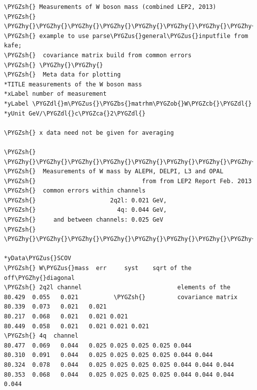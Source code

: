 \documentclass[a4paper,10pt,english]{sphinxmanual}
\def\PYGZbs{\char`\\}
\def\PYGZus{\char`\_}
\def\PYGZob{\char`\{}
\def\PYGZcb{\char`\}}
\def\PYGZca{\char`\^}
\def\PYGZsh{\char`\#}
\def\PYGZdl{\char`\$}
\def\PYGZhy{\char`\-}
\begin{document}
\begin{Verbatim}[commandchars=\\\{\}]
\PYGZsh{} Measurements of W boson mass (combined LEP2, 2013)
\PYGZsh{} \PYGZhy{}\PYGZhy{}\PYGZhy{}\PYGZhy{}\PYGZhy{}\PYGZhy{}\PYGZhy{}\PYGZhy{}\PYGZhy{}\PYGZhy{}\PYGZhy{}\PYGZhy{}\PYGZhy{}\PYGZhy{}\PYGZhy{}\PYGZhy{}\PYGZhy{}\PYGZhy{}\PYGZhy{}\PYGZhy{}\PYGZhy{}\PYGZhy{}\PYGZhy{}\PYGZhy{}\PYGZhy{}\PYGZhy{}\PYGZhy{}\PYGZhy{}\PYGZhy{}\PYGZhy{}\PYGZhy{}\PYGZhy{}\PYGZhy{}\PYGZhy{}\PYGZhy{}\PYGZhy{}\PYGZhy{}\PYGZhy{}\PYGZhy{}\PYGZhy{}\PYGZhy{}\PYGZhy{}\PYGZhy{}\PYGZhy{}\PYGZhy{}\PYGZhy{}\PYGZhy{}\PYGZhy{}\PYGZhy{}\PYGZhy{}
\PYGZsh{} example to use parse\PYGZus{}general\PYGZus{}inputfile from kafe;
\PYGZsh{}  covariance matrix build from common errors
\PYGZsh{} \PYGZhy{}\PYGZhy{}
\PYGZsh{}  Meta data for plotting
*TITLE measurements of the W boson mass
*xLabel number of measurement
*yLabel \PYGZdl{}m\PYGZus{}\PYGZbs{}matrhm\PYGZob{}W\PYGZcb{}\PYGZdl{}
*yUnit GeV/\PYGZdl{}c\PYGZca{}2\PYGZdl{}

\PYGZsh{} x data need not be given for averaging

\PYGZsh{} \PYGZhy{}\PYGZhy{}\PYGZhy{}\PYGZhy{}\PYGZhy{}\PYGZhy{}\PYGZhy{}\PYGZhy{}\PYGZhy{}\PYGZhy{}\PYGZhy{}\PYGZhy{}\PYGZhy{}\PYGZhy{}\PYGZhy{}\PYGZhy{}\PYGZhy{}\PYGZhy{}\PYGZhy{}\PYGZhy{}\PYGZhy{}\PYGZhy{}\PYGZhy{}\PYGZhy{}\PYGZhy{}\PYGZhy{}\PYGZhy{}\PYGZhy{}\PYGZhy{}\PYGZhy{}\PYGZhy{}\PYGZhy{}\PYGZhy{}\PYGZhy{}\PYGZhy{}\PYGZhy{}\PYGZhy{}\PYGZhy{}\PYGZhy{}\PYGZhy{}\PYGZhy{}\PYGZhy{}\PYGZhy{}\PYGZhy{}\PYGZhy{}\PYGZhy{}\PYGZhy{}\PYGZhy{}\PYGZhy{}\PYGZhy{}\PYGZhy{}\PYGZhy{}\PYGZhy{}\PYGZhy{}\PYGZhy{}\PYGZhy{}\PYGZhy{}\PYGZhy{}\PYGZhy{}\PYGZhy{}
\PYGZsh{}  Measurements of W mass by ALEPH, DELPI, L3 and OPAL
\PYGZsh{}                              from from LEP2 Report Feb. 2013
\PYGZsh{}  common errors within channels
\PYGZsh{}                     2q2l: 0.021 GeV,
\PYGZsh{}                       4q: 0.044 GeV,
\PYGZsh{}     and between channels: 0.025 GeV
\PYGZsh{} \PYGZhy{}\PYGZhy{}\PYGZhy{}\PYGZhy{}\PYGZhy{}\PYGZhy{}\PYGZhy{}\PYGZhy{}\PYGZhy{}\PYGZhy{}\PYGZhy{}\PYGZhy{}\PYGZhy{}\PYGZhy{}\PYGZhy{}\PYGZhy{}\PYGZhy{}\PYGZhy{}\PYGZhy{}\PYGZhy{}\PYGZhy{}\PYGZhy{}\PYGZhy{}\PYGZhy{}\PYGZhy{}\PYGZhy{}\PYGZhy{}\PYGZhy{}\PYGZhy{}\PYGZhy{}\PYGZhy{}\PYGZhy{}\PYGZhy{}\PYGZhy{}\PYGZhy{}\PYGZhy{}\PYGZhy{}\PYGZhy{}\PYGZhy{}\PYGZhy{}\PYGZhy{}\PYGZhy{}\PYGZhy{}\PYGZhy{}\PYGZhy{}\PYGZhy{}\PYGZhy{}\PYGZhy{}\PYGZhy{}\PYGZhy{}\PYGZhy{}\PYGZhy{}\PYGZhy{}\PYGZhy{}\PYGZhy{}\PYGZhy{}\PYGZhy{}\PYGZhy{}\PYGZhy{}\PYGZhy{}

*yData\PYGZus{}SCOV
\PYGZsh{} W\PYGZus{}mass  err     syst    sqrt of the off\PYGZhy{}diagonal
\PYGZsh{} 2q2l channel                           elements of the
80.429  0.055   0.021          \PYGZsh{}         covariance matrix
80.339  0.073   0.021   0.021
80.217  0.068   0.021   0.021 0.021
80.449  0.058   0.021   0.021 0.021 0.021
\PYGZsh{} 4q  channel
80.477  0.069   0.044   0.025 0.025 0.025 0.025 0.044
80.310  0.091   0.044   0.025 0.025 0.025 0.025 0.044 0.044
80.324  0.078   0.044   0.025 0.025 0.025 0.025 0.044 0.044 0.044
80.353  0.068   0.044   0.025 0.025 0.025 0.025 0.044 0.044 0.044 0.044
\end{Verbatim}
\end{document}
